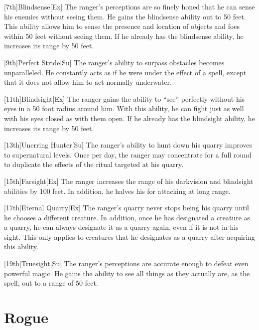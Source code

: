         [7th]{Blindsense}[Ex]
        The ranger's perceptions are so finely honed that he can sense his enemies without seeing them.
        He gains the blindsense ability out to 50 feet.
        This ability allows him to sense the presence and location of objects and foes within 50 feet without seeing them.
        If he already has the blindsense ability, he increases its range by 50 feet.

        [9th]{Perfect Stride}[Su]
        The ranger's ability to surpass obstacles becomes unparalleled.
        He constantly acts as if he were under the effect of a  spell, except that it does not allow him to act normally underwater.

        [11th]{Blindsight}[Ex]
        The ranger gains the ability to ``see'' perfectly without his eyes in a 50 foot radius around him.
        With this ability, he can fight just as well with his eyes closed as with them open.
        If he already has the blindsight ability, he increases its range by 50 feet.

        [13th]{Unerring Hunter}[Su]
        The ranger's ability to hunt down his quarry improves to supernatural levels.
        Once per day, the ranger may concentrate for a full round to duplicate the effects of the  ritual targeted at his quarry.

        [15th]{Farsight}[Ex]
        The ranger increases the range of his darkvision and blindsight abilities by 100 feet.
        In addition, he halves his  for attacking at long range.

        [17th]{Eternal Quarry}[Ex]
        The ranger's quarry never stops being his quarry until he chooses a different creature.
        In addition, once he has designated a creature as a quarry, he can always designate it as a quarry again, even if it is not in his sight.
        This only applies to creatures that he designates as a quarry after acquiring this ability.

        [19th]{Truesight}[Su]
        The ranger's perceptions are accurate enough to defeat even powerful magic.
        He gains the ability to see all things as they actually are, as the  spell, out to a range of 50 feet.

\section{Rogue}

